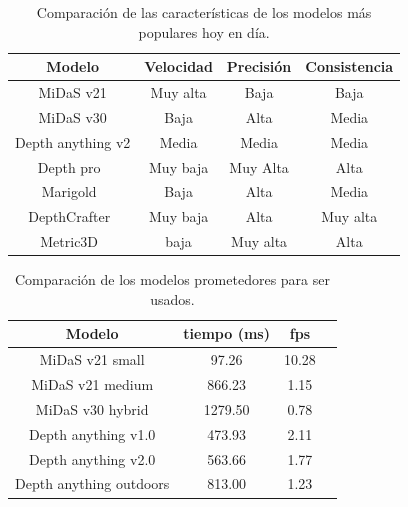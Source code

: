 \begin{table}[h]
    \centering
    \begin{tabular}{|c|c|c|c|}
        \hline
        \textbf{Modelo} & \textbf{Velocidad}    & \textbf{Precisión}    & \textbf{Consistencia}   \\
        \hline
        MiDaS v21           & Muy alta          & Baja                  & Baja                      \\
        MiDaS v30           & Baja              & Alta                  & Media                     \\
        Depth anything v2   & Media             & Media                 & Media                     \\
        Depth pro~\cite{bochkovskii2025depthpro}           & Muy baja          & Muy Alta              & Alta                      \\
        Marigold~\cite{ke2023marigold}            & Baja              & Alta                  & Media                      \\
        DepthCrafter~\cite{hu2025-depthcrafter}       & Muy baja          & Alta                  & Muy alta                  \\
        Metric3D~\cite{hu2024metric3dv2}            & baja              & Muy alta              & Alta                      \\
        \hline
    \end{tabular}
    \caption{Comparación de las características de los modelos más populares hoy en día.}
    \label{tab:mercado_estudio}
\end{table}


\begin{table}[h]
    \centering
    \begin{tabular}{|c|c|c|c|}
        \hline
        \textbf{Modelo} & \textbf{tiempo (ms)}    & \textbf{fps}    \\
        \hline
        MiDaS v21 small             & 97.26             & 10.28              \\
        MiDaS v21 medium            & 866.23          & 1.15              \\
        MiDaS v30 hybrid            & 1279.50            & 0.78             \\
        Depth anything v1.0         & 473.93           & 2.11               \\
        Depth anything v2.0         & 563.66            & 1.77              \\
        Depth anything outdoors     & 813.00          & 1.23              \\
        \hline
    \end{tabular}
    \caption{Comparación de los modelos prometedores para ser usados.}
    \label{tab:estudio_fps}
\end{table}


